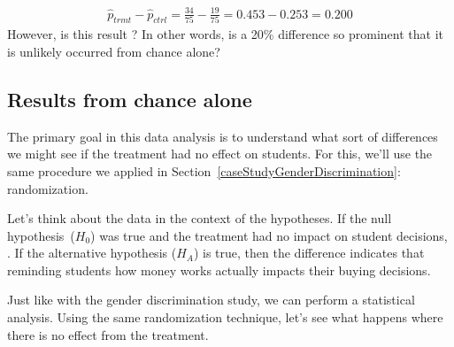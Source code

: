 \begin{align*}
\hat{p}_{trmt} - \hat{p}_{ctrl}
  = \frac{34}{75} - \frac{19}{75}
  = 0.453 - 0.253
  = 0.200
\end{align*}
However, is this result ? In other words, is a 20\% difference so prominent that it is unlikely  occurred from chance alone?

\subsection{Results from chance alone}

The primary goal in this data analysis is to understand what sort of differences we might see if the treatment had no effect on students. For this, we'll use the same procedure we applied in Section~\ref{caseStudyGenderDiscrimination}: randomization.

Let's think about the data in the context of the hypotheses. If the null  hypothesis~($H_0$) was true and the treatment had no impact on student decisions, . If the alternative hypothesis ($H_A$) is true, then the difference indicates that reminding students how money works actually impacts their buying decisions.

Just like with the gender discrimination study, we can perform a statistical analysis. Using the same randomization technique, let's see what happens  where there is no effect from the treatment.

